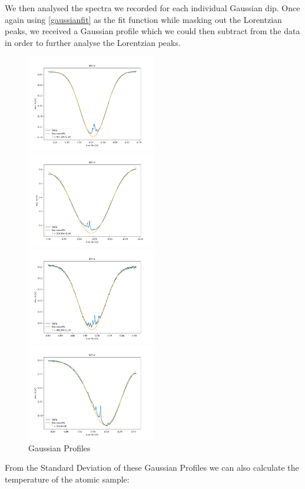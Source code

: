 \documentclass[12pt, a4paper]{article}
\begin{document}
We then analysed the spectra we recorded for each individual Gaussian dip. Once again using \autoref{gaussianfit} as the fit function while masking out the Lorentzian peaks, we received a Gaussian profile which we could then subtract from the data in order to further analyse the Lorentzian peaks.
\begin{figure}
    \centering
    \parbox{0.45\textwidth}{
        \includegraphics[width=0.5\textwidth]{gaussian1.png}
    }
    \hfill
    \parbox{0.45\textwidth}{
        \includegraphics[width=0.5\textwidth]{gaussian2.png}
    }
    \parbox{0.45\textwidth}{
        \includegraphics[width=0.5\textwidth]{gaussian3.png}
    }
    \hfill
    \parbox{0.45\textwidth}{
        \includegraphics[width=0.5\textwidth]{gaussian4.png}
    }
    \caption{Gaussian Profiles}
    \label{gaussianprofiles}
\end{figure}
From the Standard Deviation of these Gaussian Profiles we can also calculate the temperature of the atomic sample:
\end{document}
